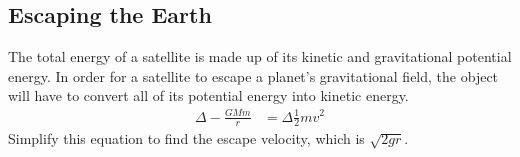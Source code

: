 \documentclass[../notes.tex]{subfiles}
\begin{document}
\subsection{Escaping the Earth}
The total energy of a satellite is made up of its kinetic and gravitational potential energy.
In order for a satellite to escape a planet's gravitational field, the object will have to convert all of its potential energy into kinetic energy.
\begin{align}
	\Delta-\frac{GMm}{r} &= \Delta\frac{1}{2}mv^2
\end{align} 
Simplify this equation to find the escape velocity, which is $\sqrt{2gr}$.
\end{document}
